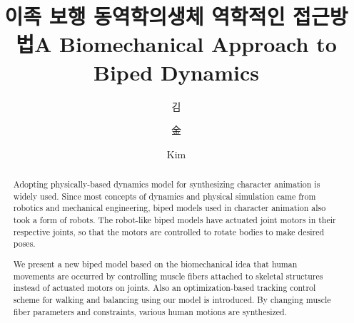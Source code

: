\documentclass[master,english,final]{kaist-ucs}
\title[korean] {이족 보행 동역학의\linebreak 생체 역학적인 접근방법}
\title[english]{A Biomechanical Approach to Biped Dynamics}
\author[korean] {김}{거 엽}
\author[chinese]{金}{거 엽}
\author[english]{Kim}{Geo Yeob}
\begin{document}

\begin{abstract}
Adopting physically-based dynamics model for synthesizing character animation is widely used.
Since most concepts of dynamics and physical simulation came from robotics and mechanical engineering,
biped models used in character animation also took a form of robots.
The robot-like biped models have actuated joint motors in their respective joints,
so that the motors are controlled to rotate bodies to make desired poses.

We present a new biped model based on the biomechanical idea that human movements are occurred
by controlling muscle fibers attached to skeletal structures instead of actuated motors on joints.
Also an optimization-based tracking control scheme for walking and balancing using our model is introduced.
By changing muscle fiber parameters and constraints, various human motions are synthesized.

\end{abstract}


\tableofcontents

\listoftables

\listoffigures

\end{document}

